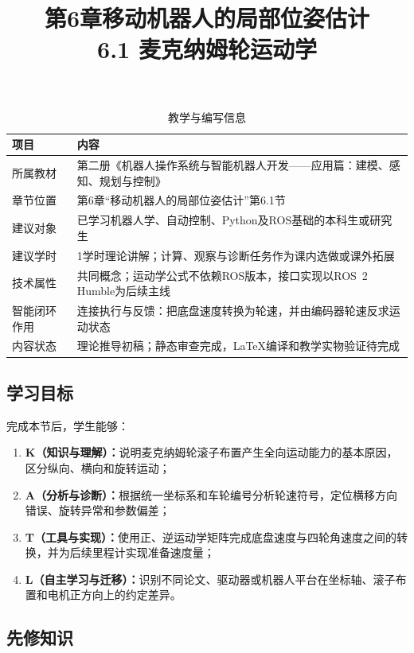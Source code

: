 \documentclass[UTF8,zihao=-4]{ctexart}
\title{第6章移动机器人的局部位姿估计\\
\large 6.1 麦克纳姆轮运动学}
\author{}
\date{}
\begin{document}
\maketitle

\begin{table}[htbp]
  \centering
  \caption*{教学与编写信息}
  \begin{tabular}{p{}p{}}
    \toprule
    项目 & 内容 \\
    \midrule
    所属教材 & 第二册《机器人操作系统与智能机器人开发——应用篇：建模、感知、规划与控制》 \\
    章节位置 & 第6章“移动机器人的局部位姿估计”第6.1节 \\
    建议对象 & 已学习机器人学、自动控制、Python及ROS基础的本科生或研究生 \\
    建议学时 & 1学时理论讲解；计算、观察与诊断任务作为课内选做或课外拓展 \\
    技术属性 & 共同概念；运动学公式不依赖ROS版本，接口实现以ROS~2 Humble为后续主线 \\
    智能闭环作用 & 连接执行与反馈：把底盘速度转换为轮速，并由编码器轮速反求运动状态 \\
    内容状态 & 理论推导初稿；静态审查完成，LaTeX编译和教学实物验证待完成 \\
    \bottomrule
  \end{tabular}
\end{table}

\subsection*{学习目标}

完成本节后，学生能够：
\begin{enumerate}
  \item \textbf{K（知识与理解）：}说明麦克纳姆轮滚子布置产生全向运动能力的基本原因，区分纵向、横向和旋转运动；
  \item \textbf{A（分析与诊断）：}根据统一坐标系和车轮编号分析轮速符号，定位横移方向错误、旋转异常和参数偏差；
  \item \textbf{T（工具与实现）：}使用正、逆运动学矩阵完成底盘速度与四轮角速度之间的转换，并为后续里程计实现准备速度量；
  \item \textbf{L（自主学习与迁移）：}识别不同论文、驱动器或机器人平台在坐标轴、滚子布置和电机正方向上的约定差异。
\end{enumerate}

\subsection*{先修知识}
\end{document}
